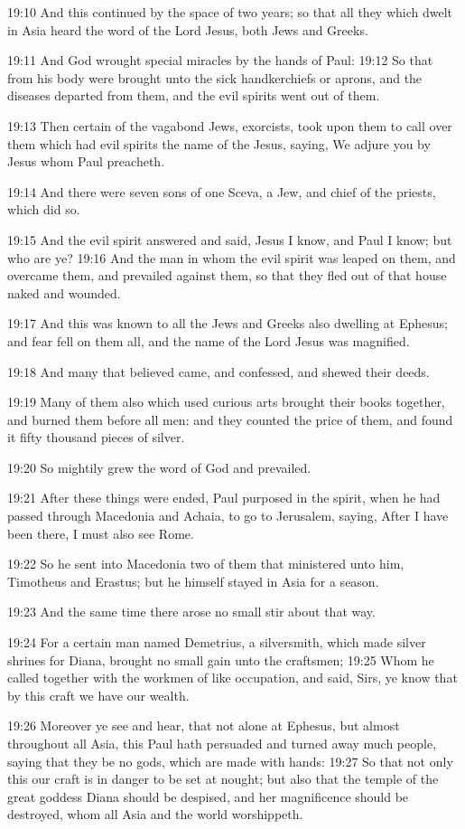 19:10 And this continued by the space of two years; so that all they
which dwelt in Asia heard the word of the Lord Jesus, both Jews and
Greeks.

19:11 And God wrought special miracles by the hands of Paul: 19:12 So
that from his body were brought unto the sick handkerchiefs or aprons,
and the diseases departed from them, and the evil spirits went out of
them.

19:13 Then certain of the vagabond Jews, exorcists, took upon them to
call over them which had evil spirits the name of the \LORD Jesus,
saying, We adjure you by Jesus whom Paul preacheth.

19:14 And there were seven sons of one Sceva, a Jew, and chief of the
priests, which did so.

19:15 And the evil spirit answered and said, Jesus I know, and Paul I
know; but who are ye?  19:16 And the man in whom the evil spirit was
leaped on them, and overcame them, and prevailed against them, so that
they fled out of that house naked and wounded.

19:17 And this was known to all the Jews and Greeks also dwelling at
Ephesus; and fear fell on them all, and the name of the Lord Jesus was
magnified.

19:18 And many that believed came, and confessed, and shewed their
deeds.

19:19 Many of them also which used curious arts brought their books
together, and burned them before all men: and they counted the price
of them, and found it fifty thousand pieces of silver.

19:20 So mightily grew the word of God and prevailed.

19:21 After these things were ended, Paul purposed in the spirit, when
he had passed through Macedonia and Achaia, to go to Jerusalem,
saying, After I have been there, I must also see Rome.

19:22 So he sent into Macedonia two of them that ministered unto him,
Timotheus and Erastus; but he himself stayed in Asia for a season.

19:23 And the same time there arose no small stir about that way.

19:24 For a certain man named Demetrius, a silversmith, which made
silver shrines for Diana, brought no small gain unto the craftsmen;
19:25 Whom he called together with the workmen of like occupation, and
said, Sirs, ye know that by this craft we have our wealth.

19:26 Moreover ye see and hear, that not alone at Ephesus, but almost
throughout all Asia, this Paul hath persuaded and turned away much
people, saying that they be no gods, which are made with hands: 19:27
So that not only this our craft is in danger to be set at nought; but
also that the temple of the great goddess Diana should be despised,
and her magnificence should be destroyed, whom all Asia and the world
worshippeth.

